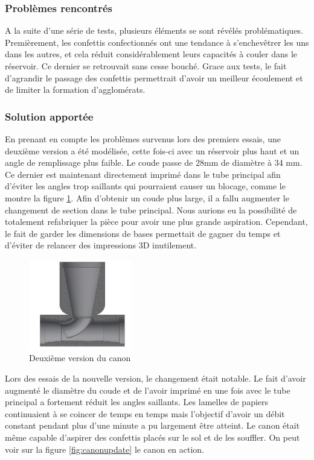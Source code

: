 \subsubsection{Problèmes rencontrés}

A la suite d'une série de tests, plusieurs éléments se sont révélés problématiques. Premièrement, les 
confettis confectionnés ont une tendance à s’enchevêtrer les uns dans les autres, et cela réduit 
considérablement leurs capacités à couler dans le réservoir. Ce dernier se retrouvait sans cesse 
bouché. Grace aux tests, le fait d’agrandir le passage des confettis permettrait d’avoir un meilleur 
écoulement et de limiter la formation d'agglomérats.

\subsubsection{Solution apportée}

En prenant en compte les problèmes survenus lors des premiers essais, une deuxième version a été modélisée, 
cette fois-ci avec un réservoir plus haut et un angle de remplissage plus faible. Le coude passe 
de 28mm de diamètre à 34 mm. Ce dernier est maintenant directement imprimé dans le tube principal afin 
d’éviter les angles trop saillants qui pourraient causer un blocage, comme le montre la figure \ref{fig:venturiv2}. 
Afin d’obtenir un coude plus large,
il a fallu augmenter le changement de section dans le tube principal. Nous aurions eu la possibilité de 
totalement refabriquer la pièce pour avoir une plus grande aspiration. Cependant, le fait de garder 
les dimensions de bases permettait de gagner du temps et d’éviter de relancer des impressions 3D inutilement.

\begin{figure}[H]
    \centering
    \includegraphics[width=0.4\textwidth]{Images/photos_PGA/venturi_v2.PNG}
    \caption{Deuxième version du canon}
    \label{fig:venturiv2}
\end{figure}

Lors des essais de la nouvelle version, le changement était notable. Le fait d’avoir augmenté le diamètre 
du coude et de l’avoir imprimé en une fois avec le tube principal a fortement réduit les angles saillants. 
Les lamelles de papiers continuaient à se coincer de temps en temps mais l’objectif d’avoir un débit 
constant pendant plus d'une minute a pu largement être atteint. Le canon était même capable d'aspirer des confettis
placés sur le sol et de les souffler. On peut voir sur la figure \ref{fig:canonupdate} le canon en action.

